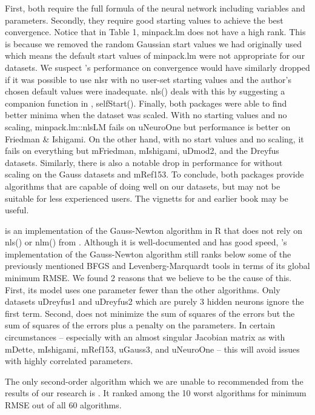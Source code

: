 First, both require the full formula of the neural network including
variables and parameters. Secondly, they require good starting values to
achieve the best convergence. Notice that in Table 1, minpack.lm does
not have a high rank. This is because we removed the random Gaussian
start values we had originally used which means the default start values
of minpack.lm were not appropriate for our datasets. We suspect
's performance on convergence would have similarly dropped
if it was possible to use nlsr with no user-set starting values and the
author's chosen default values were inadequate. nls() deals with this by
suggesting a companion function in , selfStart().
Finally, both packages were able to find better minima when the dataset
was scaled. With no starting values and no scaling, minpack.lm::nlsLM
fails on uNeuroOne but performance is better on Friedman \& Ishigami. On
the other hand, with no start values and no scaling, it fails on
everything but mFriedman, mIshigami, uDmod2, and the Dreyfus datasets.
Similarly, there is also a notable drop in performance for
 without scaling on the Gauss datasets and mRef153. To
conclude, both packages provide algorithms that are capable of doing
well on our datasets, but may not be suitable for less experienced
users. The vignetts for  and earlier book
\citep{Nash-nlpor14} may be useful.

 \citep{R-brnn} is an implementation of the Gauss-Newton
algorithm in R that does not rely on nls() or nlm() from
. Although it is well-documented and has good speed,
's implementation of the Gauss-Newton algorithm still
ranks below some of the previously mentioned BFGS and
Levenberg-Marquardt tools in terms of its global minimum RMSE. We found
2 reasons that we believe to be the cause of this. First, its model uses
one parameter fewer than the other algorithms. Only datasets uDreyfus1
and uDreyfus2 which are purely 3 hidden neurons ignore the first term.
Second,  does not minimize the sum of squares of the
errors but the sum of squares of the errors plus a penalty on the
parameters. In certain circumstances -- especially with an almost
singular Jacobian matrix as with mDette, mIshigami, mRef153, uGauss3,
and uNeuroOne -- this will avoid issues with highly correlated
parameters.

The only second-order algorithm which we are unable to recommended from
the results of our research is  \citep{R-snnR}. It ranked
among the 10 worst algorithms for minimum RMSE out of all 60 algorithms.

